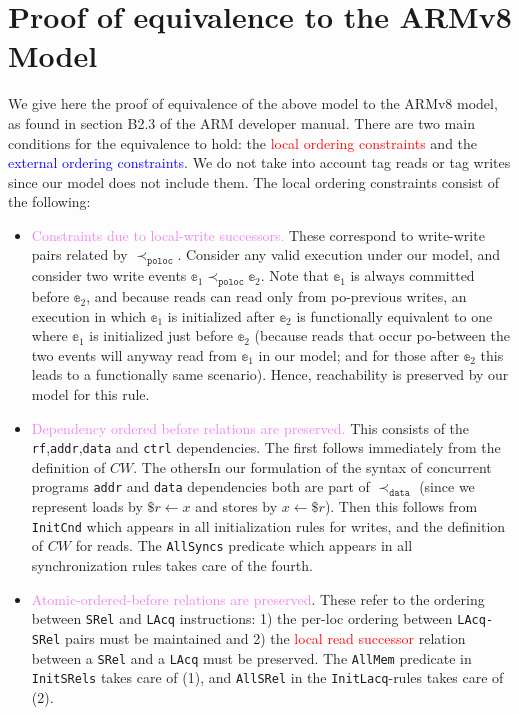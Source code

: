 \documentclass{article}
\newcommand{\var}{\texttt}
\begin{document}
\section{Proof of equivalence to the ARMv8 Model}
We give here the proof of equivalence of the above model to the ARMv8 model, as found in section B2.3 of the ARM developer manual. There are two main conditions for the equivalence to hold: the \textcolor{red}{local ordering constraints} and the \textcolor{blue}{external ordering constraints}. We do not take into account tag reads or tag writes since our model does not include them. The local ordering constraints consist of the following:
\begin{itemize}
    \item \textcolor{violet}{Constraints due to local-write successors.} These correspond to write-write pairs related by $\prec_\texttt{poloc}$. Consider any valid execution under our model, and consider two write events $\mathbb{e}_1 \prec_\var{poloc} \mathbb{e}_2$. Note that $\mathbb{e}_1$ is always committed before $\mathbb{e}_2$, and because reads can read only from po-previous writes, an execution in which $\mathbb{e}_1$ is initialized after $\mathbb{e}_2$ is functionally equivalent to one where $\mathbb{e}_1$ is initialized just before $\mathbb{e}_2$ (because reads that occur po-between the two events will anyway read from $\mathbb{e}_1$ in our model; and for those after $\mathbb{e}_2$ this leads to a functionally same scenario). Hence, reachability is preserved by our model for this rule.
    \item \textcolor{violet}{Dependency ordered before relations are preserved.} This consists of the \texttt{rf},\texttt{addr},\texttt{data} and \texttt{ctrl} dependencies. The first follows immediately from the definition of $CW$. The othersIn our formulation of the syntax of concurrent programs \texttt{addr} and \texttt{data} dependencies both are part of $\prec_\texttt{data}$ (since we represent loads by $\$r \longleftarrow x$ and stores by $x \longleftarrow \$r$). Then this follows from \texttt{InitCnd} which appears in all initialization rules for writes, and the definition of $CW$ for reads. The \texttt{AllSyncs} predicate which appears in all synchronization rules takes care of the fourth.
    \item \textcolor{violet}{Atomic-ordered-before relations are preserved}. These refer to the ordering between \texttt{SRel} and \texttt{LAcq} instructions: 1) the per-loc ordering between \texttt{LAcq-SRel} pairs must be maintained and 2) the \textcolor{red}{local read successor} relation between a \texttt{SRel} and a \texttt{LAcq} must be preserved. The \texttt{AllMem} predicate in \texttt{InitSRels} takes care of (1), and \texttt{AllSRel} in the \texttt{InitLacq}-rules takes care of (2).

\end{itemize}
\end{document}
